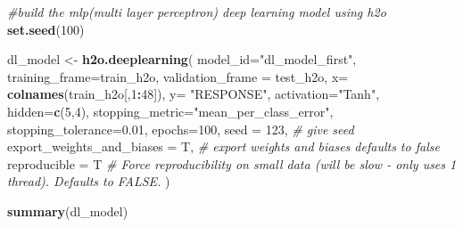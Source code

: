 \documentclass[]{article}
\newenvironment{Shaded}{\begin{snugshade}}{\end{snugshade}}
\newcommand{\KeywordTok}[1]{\textcolor[rgb]{0.13,0.29,0.53}{\textbf{#1}}}
\newcommand{\DataTypeTok}[1]{\textcolor[rgb]{0.13,0.29,0.53}{#1}}
\newcommand{\DecValTok}[1]{\textcolor[rgb]{0.00,0.00,0.81}{#1}}
\newcommand{\FloatTok}[1]{\textcolor[rgb]{0.00,0.00,0.81}{#1}}
\newcommand{\StringTok}[1]{\textcolor[rgb]{0.31,0.60,0.02}{#1}}
\newcommand{\CommentTok}[1]{\textcolor[rgb]{0.56,0.35,0.01}{\textit{#1}}}
\newcommand{\OperatorTok}[1]{\textcolor[rgb]{0.81,0.36,0.00}{\textbf{#1}}}
\newcommand{\NormalTok}[1]{#1}
\begin{document}
\begin{Shaded}
\begin{Highlighting}[]
\CommentTok{#build the mlp(multi layer perceptron) deep learning model using h2o}
\KeywordTok{set.seed}\NormalTok{(}\DecValTok{100}\NormalTok{)}

\NormalTok{dl_model <-}\StringTok{ }\KeywordTok{h2o.deeplearning}\NormalTok{(}
  \DataTypeTok{model_id=}\StringTok{"dl_model_first"}\NormalTok{, }
  \DataTypeTok{training_frame=}\NormalTok{train_h2o, }
  \DataTypeTok{validation_frame =}\NormalTok{ test_h2o,}
  \DataTypeTok{x=} \KeywordTok{colnames}\NormalTok{(train_h2o[,}\DecValTok{1}\OperatorTok{:}\DecValTok{48}\NormalTok{]),}
  \DataTypeTok{y=} \StringTok{"RESPONSE"}\NormalTok{,}
  \DataTypeTok{activation=}\StringTok{"Tanh"}\NormalTok{,  }
  \DataTypeTok{hidden=}\KeywordTok{c}\NormalTok{(}\DecValTok{5}\NormalTok{,}\DecValTok{4}\NormalTok{), }
  \DataTypeTok{stopping_metric=}\StringTok{"mean_per_class_error"}\NormalTok{,}
  \DataTypeTok{stopping_tolerance=}\FloatTok{0.01}\NormalTok{,}
  \DataTypeTok{epochs=}\DecValTok{100}\NormalTok{,}
  \DataTypeTok{seed =} \DecValTok{123}\NormalTok{, }\CommentTok{# give seed }
  \DataTypeTok{export_weights_and_biases =}\NormalTok{ T, }\CommentTok{# export weights and biases defaults to false}
  \DataTypeTok{reproducible =}\NormalTok{ T }\CommentTok{# Force reproducibility on small data (will be slow - only uses 1 thread). Defaults to FALSE.}
\NormalTok{)}
\end{Highlighting}
\end{Shaded}

\begin{Shaded}
\begin{Highlighting}[]
\KeywordTok{summary}\NormalTok{(dl_model)}
\end{Highlighting}
\end{Shaded}
\end{document}
